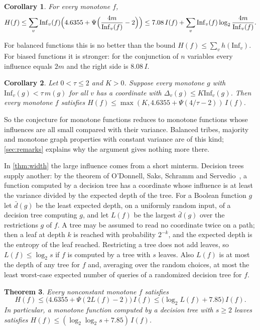 \documentclass[11pt]{amsart}
\newtheorem{theorem}{Theorem}[section]
\newtheorem{corollary}[theorem]{Corollary}
\theoremstyle{remark}
\newcommand{\Inf}{\mathrm{Inf}}
\begin{document}
\begin{corollary}\label{cor:han}
For every monotone $f$,
\[
H(f)\le\sum_v\Inf_v(f)\Bigl(4.6355+\Psi\Bigl(\frac{4m}{\Inf_v(f)}-2\Bigr)\Bigr)\le 7.08\,I(f)+\sum_v\Inf_v(f)\log_2\frac{4m}{\Inf_v(f)}.
\]
\end{corollary}

For balanced functions this is no better than the bound $H(f)\le\sum_vh(\Inf_v)$. For biased functions it is
stronger: for the
conjunction of $n$ variables every influence equals $2m$ and the right side is $8.08\,I$.

\begin{corollary}\label{cor:reduce}
Let $0<\tau\le2$ and $K>0$. Suppose every monotone $g$ with $\Inf_v(g)<\tau\,m(g)$ for all $v$ has a coordinate with
$\Delta_v(g)\le K\Inf_v(g)$. Then every monotone $f$ satisfies $H(f)\le\max(K,4.6355+\Psi(4/\tau-2))\,I(f)$.
\end{corollary}

So the conjecture for monotone functions reduces to monotone functions whose influences are all small compared with
their variance. Balanced tribes, majority and monotone graph properties with constant variance are of this kind;
\cref{sec:remarks} explains why the argument gives nothing more there.

In \cref{thm:width} the large influence comes from a short minterm. Decision trees supply another: by the theorem of
O'Donnell, Saks, Schramm and Servedio~\cite{OSSS05}, a function computed by a decision tree has a coordinate whose
influence is at least the variance divided by the expected depth of the tree. For a Boolean function $g$ let $\bar
d(g)$ be the least expected depth, on a uniformly random input, of a decision tree computing $g$, and let $L(f)$ be the
largest $\bar d(g)$ over the restrictions $g$ of $f$. A tree may be assumed to read no coordinate twice on a path;
then a leaf at depth $k$ is reached with probability $2^{-k}$, and the expected depth is the entropy of the leaf
reached. Restricting a tree does not add leaves, so $L(f)\le\log_2s$ if $f$ is computed by a tree with $s$ leaves. Also $L(f)$ is at most the
depth of any tree for $f$ and, averaging over the random choices, at most the least worst-case expected number of
queries of a randomized decision tree for $f$.

\begin{theorem}\label{thm:dt}
Every nonconstant monotone $f$ satisfies
\[
H(f)\le\bigl(4.6355+\Psi(2L(f)-2)\bigr)\,I(f)\le\bigl(\log_2L(f)+7.85\bigr)\,I(f).
\]
In particular, a monotone function computed by a decision tree with $s\ge2$ leaves satisfies
$H(f)\le(\log_2\log_2s+7.85)\,I(f)$.
\end{theorem}
\end{document}

